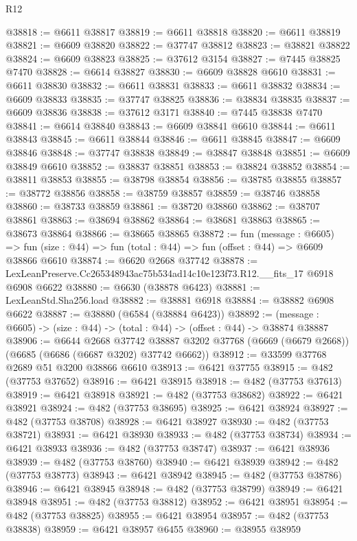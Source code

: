 \begin{lexlean}{R12}
\begin{coremodule}
@38818 := @6611 @38817
@38819 := @6611 @38818
@38820 := @6611 @38819
@38821 := @6609 @38820
@38822 := @37747 @38812
@38823 := @38821 @38822
@38824 := @6609 @38823
@38825 := @37612 @3154
@38827 := @7445 @38825 @7470
@38828 := @6614 @38827
@38830 := @6609 @38828 @6610
@38831 := @6611 @38830
@38832 := @6611 @38831
@38833 := @6611 @38832
@38834 := @6609 @38833
@38835 := @37747 @38825
@38836 := @38834 @38835
@38837 := @6609 @38836
@38838 := @37612 @3171
@38840 := @7445 @38838 @7470
@38841 := @6614 @38840
@38843 := @6609 @38841 @6610
@38844 := @6611 @38843
@38845 := @6611 @38844
@38846 := @6611 @38845
@38847 := @6609 @38846
@38848 := @37747 @38838
@38849 := @38847 @38848
@38851 := @6609 @38849 @6610
@38852 := @38837 @38851
@38853 := @38824 @38852
@38854 := @38811 @38853
@38855 := @38798 @38854
@38856 := @38785 @38855
@38857 := @38772 @38856
@38858 := @38759 @38857
@38859 := @38746 @38858
@38860 := @38733 @38859
@38861 := @38720 @38860
@38862 := @38707 @38861
@38863 := @38694 @38862
@38864 := @38681 @38863
@38865 := @38673 @38864
@38866 := @38665 @38865
@38872 := fun (message : @6605) =>
  fun (size : @44) => fun (total : @44) => fun (offset : @44) => @6609 @38866 @6610
@38874 := @6620 @2668 @37742
@38878 := LexLeanPreserve.Cc265348943ac75b534ad14c10e123f73.R12.__fits_17 @6918 @6908 @6622
@38880 := @6630 (@38878 @6423)
@38881 := LexLeanStd.Sha256.load
@38882 := @38881 @6918
@38884 := @38882 @6908 @6622
@38887 := @38880 (@6584 (@38884 @6423))
@38892 := (message : @6605) -> (size : @44) -> (total : @44) -> (offset : @44) -> @38874 @38887
@38906 := @6644
    @2668
    @37742
    @38887
    @3202
    @37768
    (@6669 (@6679 @2668))
    (@6685 (@6686 (@6687 @3202) @37742 @6662))
@38912 := @33599 @37768 @2689 @51 @3200 @38866 @6610
@38913 := @6421 @37755
@38915 := @482 (@37753 @37652)
@38916 := @6421 @38915
@38918 := @482 (@37753 @37613)
@38919 := @6421 @38918
@38921 := @482 (@37753 @38682)
@38922 := @6421 @38921
@38924 := @482 (@37753 @38695)
@38925 := @6421 @38924
@38927 := @482 (@37753 @38708)
@38928 := @6421 @38927
@38930 := @482 (@37753 @38721)
@38931 := @6421 @38930
@38933 := @482 (@37753 @38734)
@38934 := @6421 @38933
@38936 := @482 (@37753 @38747)
@38937 := @6421 @38936
@38939 := @482 (@37753 @38760)
@38940 := @6421 @38939
@38942 := @482 (@37753 @38773)
@38943 := @6421 @38942
@38945 := @482 (@37753 @38786)
@38946 := @6421 @38945
@38948 := @482 (@37753 @38799)
@38949 := @6421 @38948
@38951 := @482 (@37753 @38812)
@38952 := @6421 @38951
@38954 := @482 (@37753 @38825)
@38955 := @6421 @38954
@38957 := @482 (@37753 @38838)
@38959 := @6421 @38957 @6455
@38960 := @38955 @38959

\end{coremodule}
\end{lexlean}
